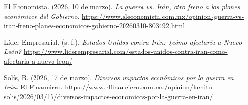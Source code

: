 \documentclass[11pt,a4paper]{article}
\begin{document}
El Economista. (2026, 10 de marzo). \textit{La guerra vs. Irán, otro freno a los planes económicos del Gobierno}. \url{https://www.eleconomista.com.mx/opinion/guerra-vs-iran-freno-planes-economicos-gobierno-20260310-803492.html}

Líder Empresarial. (s. f.). \textit{Estados Unidos contra Irán: ¿cómo afectaría a Nuevo León?} \url{https://www.liderempresarial.com/estados-unidos-contra-iran-como-afectaria-a-nuevo-leon/}

Solís, B. (2026, 17 de marzo). \textit{Diversos impactos económicos por la guerra en Irán}. El Financiero. \url{https://www.elfinanciero.com.mx/opinion/benito-solis/2026/03/17/diversos-impactos-economicos-por-la-guerra-en-iran/}
\par
\endgroup

\vspace{2cm}
\end{document}
